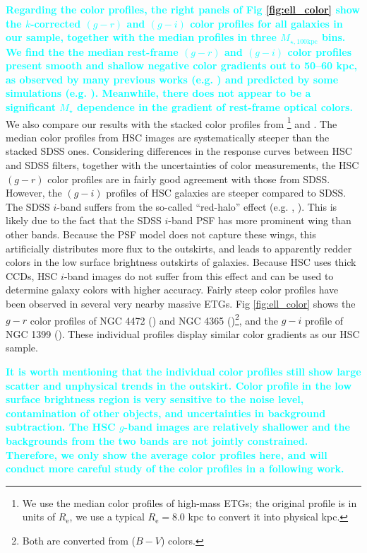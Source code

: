 \documentclass[a4paper,fleqn,usenatbib]{mnras}
\def\mstar{{$M_{\star}$}}
\def\mtot{{$M_{\star,100\mathrm{kpc}}$}}
\newcommand{\song}[1]{\textcolor{cyan}{\textbf{#1}}}
\begin{document}
    \song{
    Regarding the color profiles, the right panels of Fig \ref{fig:ell_color} show 
    the $k$-corrected $(g-r)$ and $(g-i)$ color profiles for all galaxies in our 
    sample, together with the median profiles in three \mtot{} bins. 
    We find the the median rest-frame $(g-r)$ and $(g-i)$ color profiles present 
    smooth and shallow negative color gradients out to 50--60 kpc, as observed by 
    many previous works (e.g. \citealt{Carollo1993, LaBarbera2012}) and predicted 
    by some simulations (e.g. \citealt{Hirschmann2015}). 
    Meanwhile, there does not appear to be a significant \mstar{} dependence 
    in the gradient of rest-frame optical colors. 
    }
    We also compare our results with the stacked color profiles from  
    \citealt{LaBarbera2010}\footnote{We use the median color profiles of high-mass 
    ETGs; the original profile is in units of $R_{\mathrm{e}}$, we use a typical 
    $R_{\mathrm{e}}=8.0$ kpc to convert it into physical kpc.} and 
    \citealt{DSouza2014}.
    The median color profiles from HSC images are systematically steeper than the 
    stacked SDSS ones. 
    Considering differences in the response curves between HSC and SDSS filters, 
    together with the uncertainties of color measurements, the HSC $(g-r)$ color 
    profiles are in fairly good agreement with those from SDSS. 
    However, the $(g-i)$ profiles of HSC galaxies are steeper compared to SDSS. 
    The SDSS $i$-band suffers from the so-called ``red-halo'' effect
    (e.g. \citealt{Wu2005}, \citealt{Tal2011}).  
    This is likely due to the fact that the SDSS $i$-band PSF has more prominent 
    wing than other bands. 
    Because the PSF model does not capture these wings, this artificially distributes 
    more flux to the outskirts, and leads to apparently redder colors in the low 
    surface brightness outskirts of galaxies. 
    Because HSC uses thick CCDs, HSC $i$-band images do not suffer from this effect 
    and can be used to determine galaxy colors with higher accuracy. 
    Fairly steep color profiles have been observed in several very nearby massive 
    ETGs.  
    Fig \ref{fig:ell_color} shows the $g-r$ color profiles of NGC 4472 
    (\citealt{Mihos2013}) and NGC 4365 (\citealt{Mihos2017})\footnote{
    Both are converted from ($B-V$) colors.}, and the $g-i$ profile of NGC 1399 
    (\citealt{Iodice2016}). 
    These individual profiles display similar color gradients as our HSC sample.  
   
    \song{
    It is worth mentioning that the individual color profiles still show large 
    scatter and unphysical trends in the outskirt.  
    Color profile in the low surface brightness region is very sensitive to the 
    noise level, contamination of other objects, and uncertainties in background 
    subtraction. 
    The HSC $g$-band images are relatively shallower and the backgrounds from the
    two bands are not jointly constrained. 
    Therefore, we only show the average color profiles here, and will conduct 
    more careful study of the color profiles in a following work.
    } 
    
\end{document}
